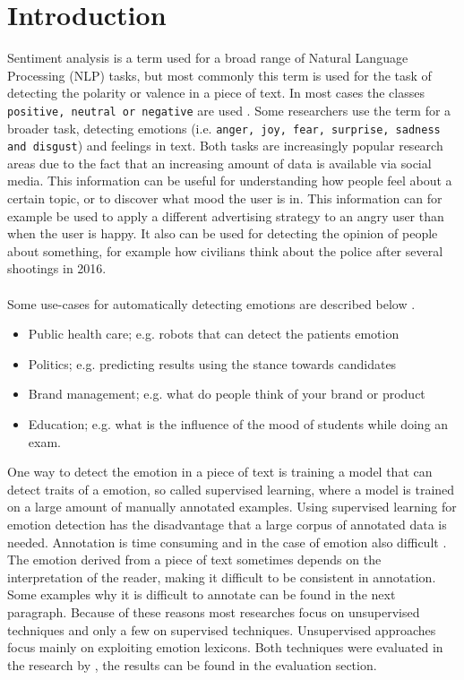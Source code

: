 \documentclass[
10pt, %
a4paper, %
oneside, %
headinclude,footinclude, %
BCOR5mm, %
]{scrartcl}
\begin{document}
\section{Introduction}
Sentiment analysis is a term used for a broad range of Natural Language Processing (NLP) tasks, but most commonly this term is used for the task of detecting the polarity or valence in a piece of text. In most cases the classes \texttt{positive, neutral or negative} are used \citep{SentimentEmotionSurvey2015}. Some researchers use the term for a broader task, detecting emotions (i.e.  \texttt{anger, joy, fear, surprise, sadness and disgust}) and feelings in text. Both tasks are increasingly popular research areas due to the fact that an increasing amount of data is available via social media. This information can be useful for understanding how people feel about a certain topic, or to discover what mood the user is in. This information can for example be used to apply a different advertising strategy to an angry user than when the user is happy. It also can be used for detecting the opinion of people about something, for example how civilians think about the police after several shootings in 2016.\\\\
Some use-cases for automatically detecting emotions are described below \citep{SentimentEmotionSurvey2015}.
\begin{itemize}
\item Public health care; e.g. robots that can detect the patients emotion
\item Politics; e.g. predicting results using the stance towards candidates
\item Brand management; e.g. what do people think of your brand or product
\item Education; e.g. what is the influence of the mood of students while doing an exam.
\end{itemize}
One way to detect the emotion in a piece of text is training a model that can detect traits of a emotion, so called supervised learning, where a model is trained on a large amount of manually annotated examples. Using supervised learning for emotion detection has the disadvantage that a large corpus of annotated data is needed. Annotation is time consuming and in the case of emotion also difficult \citep{kim2010evaluation}. The emotion derived from a piece of text sometimes depends on the interpretation of the reader, making it difficult to be consistent in annotation. Some examples why it is difficult to annotate can be found in the next paragraph. Because of these reasons most researches focus on unsupervised techniques \citep{kim2010evaluation} and only a few on supervised techniques. Unsupervised approaches focus mainly on exploiting emotion lexicons. Both techniques were evaluated in the research by \citep{strapparava2008learning}, the results can be found in the evaluation section.\\\\
\end{document}

